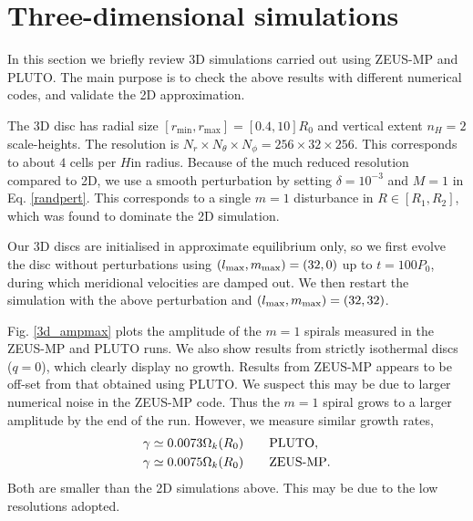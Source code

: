 \section{Three-dimensional simulations}\label{results3d}
In this section we briefly review 3D simulations carried 
out using ZEUS-MP and PLUTO. The main purpose is to check 
the above results with different numerical codes, and validate  
the 2D approximation.    

The 3D disc has radial size
$[r_\mathrm{min},r_\mathrm{max}]=[0.4,10]R_0$ and vertical extent 
$n_H=2$ scale-heights. The resolution is $N_r\times N_\theta\times
N_\phi=256\times32\times256$. This corresponds to about $4$ cells per
$H$in radius. 
Because of the much reduced resolution 
compared to 2D, we use a smooth perturbation by setting
$\delta = 10^{-3}$ and $M=1$ in Eq. \ref{randpert}. This corresponds
to a single $m=1$ disturbance in $R\in[R_1,R_2]$, which was found to dominate
the 2D simulation.  

Our 3D discs are initialised in approximate equilibrium only, so we
first evolve the disc without perturbations using  
$(l_\mathrm{max},m_\mathrm{max})=(32,0)$ up to $t=100P_0$, during which 
meridional velocities are damped out. We then restart the simulation
with the above perturbation and $(l_\mathrm{max},m_\mathrm{max})=(32,32)$. 


Fig. \ref{3d_ampmax} plots the amplitude of the $m=1$ spirals measured
in the ZEUS-MP and PLUTO runs. We also show results from strictly
isothermal discs ($q=0$), which clearly display no growth. %
Results from ZEUS-MP appears to be off-set from that obtained using
PLUTO. We suspect this may be due to larger numerical noise in the
ZEUS-MP code. Thus the $m=1$ spiral grows to a larger amplitude by the
end of the run. However, we measure similar growth rates,
\begin{align*}
&\gamma \simeq 0.0073\Omega_k(R_0) \quad\quad \mathrm{PLUTO},\\
&\gamma \simeq 0.0075\Omega_k(R_0) \quad\quad {\operatorname{ZEUS-MP}}.
\end{align*}
Both are smaller than the 2D simulations above. This may be due to the
low resolutions adopted. 

